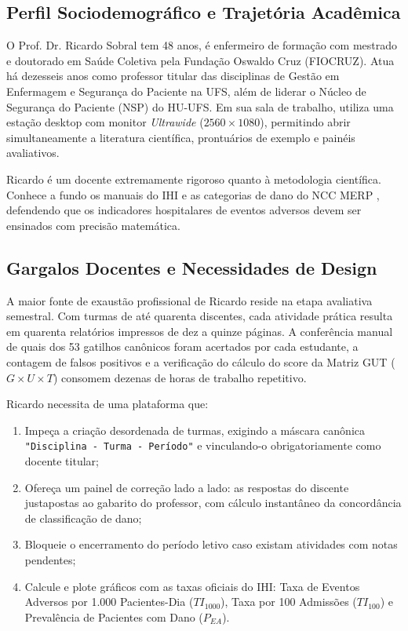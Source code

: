 \subsection{Perfil Sociodemográfico e Trajetória Acadêmica}
O Prof. Dr. Ricardo Sobral tem 48 anos, é enfermeiro de formação com mestrado e doutorado em Saúde Coletiva pela Fundação Oswaldo Cruz (FIOCRUZ). Atua há dezesseis anos como professor titular das disciplinas de Gestão em Enfermagem e Segurança do Paciente na UFS, além de liderar o Núcleo de Segurança do Paciente (NSP) do HU-UFS. Em sua sala de trabalho, utiliza uma estação desktop com monitor \textit{Ultrawide} ($2560 \times 1080$), permitindo abrir simultaneamente a literatura científica, prontuários de exemplo e painéis avaliativos.

Ricardo é um docente extremamente rigoroso quanto à metodologia científica. Conhece a fundo os manuais do IHI e as categorias de dano do NCC MERP \cite{nccmerp2001}, defendendo que os indicadores hospitalares de eventos adversos devem ser ensinados com precisão matemática.

\subsection{Gargalos Docentes e Necessidades de Design}
A maior fonte de exaustão profissional de Ricardo reside na etapa avaliativa semestral. Com turmas de até quarenta discentes, cada atividade prática resulta em quarenta relatórios impressos de dez a quinze páginas. A conferência manual de quais dos 53 gatilhos canônicos foram acertados por cada estudante, a contagem de falsos positivos e a verificação do cálculo do score da Matriz GUT ($G \times U \times T$) consomem dezenas de horas de trabalho repetitivo.

Ricardo necessita de uma plataforma que:
\begin{enumerate}
    \item Impeça a criação desordenada de turmas, exigindo a máscara canônica \texttt{"Disciplina - Turma - Período"} e vinculando-o obrigatoriamente como docente titular;
    \item Ofereça um painel de correção lado a lado: as respostas do discente justapostas ao gabarito do professor, com cálculo instantâneo da concordância de classificação de dano;
    \item Bloqueie o encerramento do período letivo caso existam atividades com notas pendentes;
    \item Calcule e plote gráficos com as taxas oficiais do IHI: Taxa de Eventos Adversos por 1.000 Pacientes-Dia ($TI_{1000}$), Taxa por 100 Admissões ($TI_{100}$) e Prevalência de Pacientes com Dano ($P_{EA}$).
\end{enumerate}

